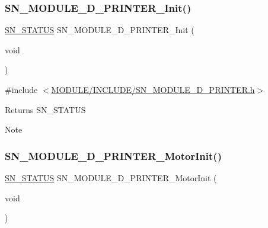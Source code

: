\subsubsection{\texorpdfstring{S\+N\+\_\+\+M\+O\+D\+U\+L\+E\+\_\+D\+\_\+\+P\+R\+I\+N\+T\+E\+R\+\_\+\+Init()}{SN\_MODULE\_3D\_PRINTER\_Init()}}
{\footnotesize\ttfamily \hyperlink{group__SYSTEM__ERROR_ga4540713b9a7a18ce44d78c3a10f7442f}{S\+N\+\_\+\+S\+T\+A\+T\+US} S\+N\+\_\+\+M\+O\+D\+U\+L\+E\+\_\+D\+\_\+\+P\+R\+I\+N\+T\+E\+R\+\_\+\+Init (\begin{DoxyParamCaption}\item[{void}]{ }\end{DoxyParamCaption})}



{\ttfamily \#include $<$\hyperlink{SN__MODULE__3D__PRINTER_8h}{M\+O\+D\+U\+L\+E/\+I\+N\+C\+L\+U\+D\+E/\+S\+N\+\_\+\+M\+O\+D\+U\+L\+E\+\_\+D\+\_\+\+P\+R\+I\+N\+T\+E\+R.\+h}$>$}

\begin{DoxyReturn}{Returns}
S\+N\+\_\+\+S\+T\+A\+T\+US
\end{DoxyReturn}
\begin{DoxyNote}{Note}

\end{DoxyNote}
\mbox{\label{group__MODULE__3D__PRINTER_ga83ec7a117b45a5760e1aecde26f69dea}} 
\subsubsection{\texorpdfstring{S\+N\+\_\+\+M\+O\+D\+U\+L\+E\+\_\+D\+\_\+\+P\+R\+I\+N\+T\+E\+R\+\_\+\+Motor\+Init()}{SN\_MODULE\_3D\_PRINTER\_MotorInit()}}
{\footnotesize\ttfamily \hyperlink{group__SYSTEM__ERROR_ga4540713b9a7a18ce44d78c3a10f7442f}{S\+N\+\_\+\+S\+T\+A\+T\+US} S\+N\+\_\+\+M\+O\+D\+U\+L\+E\+\_\+D\+\_\+\+P\+R\+I\+N\+T\+E\+R\+\_\+\+Motor\+Init (\begin{DoxyParamCaption}\item[{void}]{ }\end{DoxyParamCaption})}



